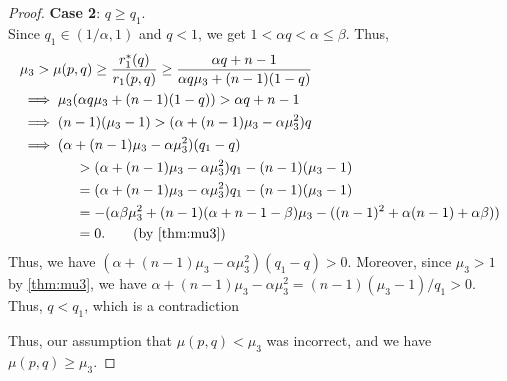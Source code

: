 \begin{proof}
\textbf{Case 2}: $q \ge q_1$.
\\ Since $q_1 \in (1/\alpha, 1)$ and $q < 1$, we get $1 < \alpha q < \alpha \le \beta$.
Thus,
\begin{align*}
& \mu_3 > \mu(p, q) \ge \frac{r_1^*(q)}{r_1(p, q)} \ge \frac{\alpha q + n-1}{\alpha q \mu_3 + (n-1)(1-q)}
\\ &\implies \mu_3(\alpha q \mu_3 + (n-1)(1-q)) > \alpha q + n-1
\\ &\implies (n-1)(\mu_3 - 1) > (\alpha + (n-1)\mu_3 - \alpha\mu_3^2)q
\\ &\implies (\alpha + (n-1)\mu_3 - \alpha\mu_3^2)(q_1-q)
    \\ &\qquad\qquad> (\alpha + (n-1)\mu_3 - \alpha\mu_3^2)q_1 - (n-1)(\mu_3 - 1)
    \\ &\qquad\qquad= (\alpha + (n-1)\mu_3 - \alpha\mu_3^2)q_1 - (n-1)(\mu_3 - 1)
    \\ &\qquad\qquad= -(\alpha\beta\mu_3^2 + (n-1)(\alpha+n-1-\beta)\mu_3 - ((n-1)^2 + \alpha(n-1) + \alpha\beta))
    \\ &\qquad\qquad= 0.
        \tag{by \cref{thm:mu3}}
\end{align*}
Thus, we have $(\alpha + (n-1)\mu_3 - \alpha\mu_3^2)(q_1-q) > 0$.
Moreover, since $\mu_3 > 1$ by \cref{thm:mu3},
we have $\alpha + (n-1)\mu_3 - \alpha\mu_3^2 = (n-1)(\mu_3 - 1)/q_1 > 0$.
Thus, $q < q_1$, which is a contradiction

Thus, our assumption that $\mu(p, q) < \mu_3$ was incorrect,
and we have $\mu(p, q) \ge \mu_3$.
\end{proof}
